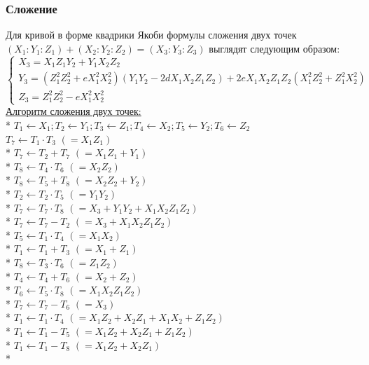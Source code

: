 \documentclass[12pt]{article}
\begin{document}
\subsubsection{Сложение}
Для кривой в форме квадрики Якоби формулы сложения двух точек $(X_1 : Y_1 : Z_1) + (X_2 : Y_2 : Z_2) = (X_3 : Y_3 : Z_3)$ выглядят следующим образом:
\begin{equation*}
\begin{cases}
X_3 = X_1Z_1Y_2 + Y_1X_2Z_2
\\
Y_3 = (Z_1^2Z_2^2 + eX_1^2X_2^2)(Y_1Y_2 - 2dX_1X_2Z_1Z_2) + 2eX_1X_2Z_1Z_2(X_1^2Z_2^2 + Z_1^2X_2^2)
\\
Z_3 = Z_1^2Z_2^2 - eX_1^2X_2^2
\end{cases}
\end{equation*}
\newpage
\underline{Алгоритм сложения двух точек:}\\*
$T_1 \leftarrow X_1; T_2 \leftarrow Y_1; T_3 \leftarrow Z_1; T_4 \leftarrow X_2; T_5 \leftarrow Y_2; T_6 \leftarrow Z_2$ \\
$T_7 \leftarrow T_1 \cdot T_3$ \hfill $(= X_1Z_1)$ \\*
$T_7 \leftarrow T_2 + T_7$ \hfill $(= X_1Z_1 + Y_1)$ \\*
$T_8 \leftarrow T_4 \cdot T_6$ \hfill $(= X_2Z_2)$ \\*
$T_8 \leftarrow T_5 + T_8$ \hfill $(= X_2Z_2 + Y_2)$ \\*
$T_2 \leftarrow T_2 \cdot T_5$ \hfill $(= Y_1Y_2)$ \\*
$T_7 \leftarrow T_7 \cdot T_8$ \hfill $(= X_3 + Y_1Y_2 + X_1X_2Z_1Z_2)$ \\*
$T_7 \leftarrow T_7 - T_2$ \hfill $(= X_3 + X_1X_2Z_1Z_2)$ \\*
$T_5 \leftarrow T_1 \cdot T_4$ \hfill $(= X_1X_2)$ \\*
$T_1 \leftarrow T_1 + T_3$ \hfill $(= X_1 + Z_1)$ \\*
$T_8 \leftarrow T_3 \cdot T_6$ \hfill $(= Z_1Z_2)$ \\*
$T_4 \leftarrow T_4 + T_6$ \hfill $(= X_2 + Z_2)$ \\*
$T_6 \leftarrow T_5 \cdot T_8$ \hfill $(= X_1X_2Z_1Z_2)$ \\*
$T_7 \leftarrow T_7 - T_6$ \hfill $(= X_3)$ \\*
$T_1 \leftarrow T_1 \cdot T_4$ \hfill $(= X_1Z_2 + X_2Z_1 + X_1X_2 + Z_1Z_2)$ \\*
$T_1 \leftarrow T_1 - T_5$ \hfill $(= X_1Z_2 + X_2Z_1 + Z_1Z_2)$ \\*
$T_1 \leftarrow T_1 - T_8$ \hfill $(= X_1Z_2 + X_2Z_1)$ \\*
\end{document}
